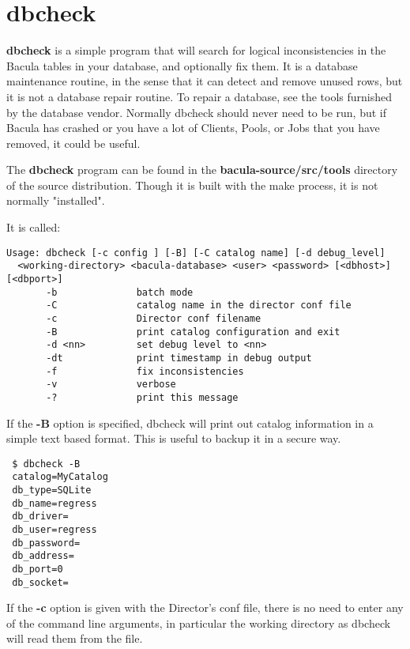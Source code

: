 \section{dbcheck}
\label{dbcheck}
{\bf dbcheck} is a simple program that will search for logical
inconsistencies in the Bacula tables in your database, and optionally fix them. 
It is a database maintenance routine, in the sense that it can
detect and remove unused rows, but it is not a database repair
routine. To repair a database, see the tools furnished by the
database vendor.  Normally dbcheck should never need to be run,
but if Bacula has crashed or you have a lot of Clients, Pools, or
Jobs that you have removed, it could be useful.  
                             
The {\bf dbcheck} program can be found in
the {\bf \lt{}bacula-source\gt{}/src/tools} directory of the source
distribution. Though it is built with the make process, it is not normally
"installed". 

It is called: 

\footnotesize
\begin{verbatim}
Usage: dbcheck [-c config ] [-B] [-C catalog name] [-d debug_level] 
  <working-directory> <bacula-database> <user> <password> [<dbhost>] [<dbport>]
       -b              batch mode
       -C              catalog name in the director conf file
       -c              Director conf filename
       -B              print catalog configuration and exit
       -d <nn>         set debug level to <nn>
       -dt             print timestamp in debug output
       -f              fix inconsistencies
       -v              verbose
       -?              print this message
\end{verbatim}
\normalsize

If the \textbf{-B} option is specified, dbcheck will print out catalog
information in a simple text based format. This is useful to backup it in a
secure way.

\begin{verbatim}
 $ dbcheck -B 
 catalog=MyCatalog
 db_type=SQLite
 db_name=regress
 db_driver=
 db_user=regress
 db_password=
 db_address=
 db_port=0
 db_socket=
\end{verbatim} %

If the {\bf -c} option is given with the Director's conf file, there is no
need to enter any of the command line arguments, in particular the working
directory as dbcheck will read them from the file. 

